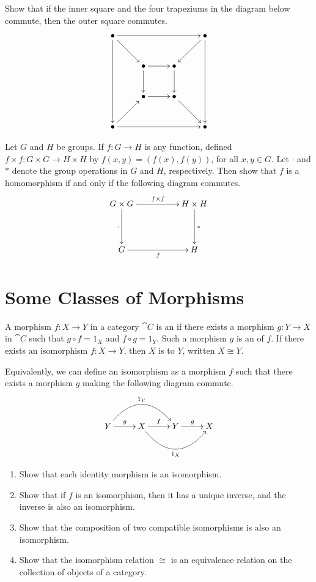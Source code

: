 \begin{Exercise}
Show that if the inner square and the four trapeziums in the diagram below commute, then the outer square commutes.
\begin{equation*}
\xymatrix@=2.5em{
\bullet \ar[ddd] \ar[rd] \ar[rrr] &&& \bullet \ar[ld] \ar[ddd] \\
& \bullet \ar[d] \ar[r] & \bullet \ar[d] & \\
& \bullet \ar[r] & \bullet \ar[rd] & \\
\bullet \ar[ru] \ar[rrr] &&& \bullet
}
\end{equation*}
\end{Exercise}

\begin{Exercise}
Let $G$ and $H$ be groups. If $f \colon G \to H$ is any function, defined $f \times f \colon G \times G \to H \times H$ by $f(x, y) = (f(x), f(y))$, for all $x, y \in G$. Let $\cdot$ and $*$ denote the group operations in $G$ and $H$, respectively. Then show that $f$ is a homomorphism if and only if the following diagram commutes.
\begin{equation*}
\xymatrix@C=5em@R=4em{
G \times G \ar[r]^{f \times f} \ar[d]_\cdot & H \times H \ar[d]^{*} \\
G \ar[r]_f & H
}
\end{equation*}
\end{Exercise}

\section{Some Classes of Morphisms}\label{sec:MorphismClasses}

A morphism $f \colon X \to Y$ in a category $\cat C$ is an  if there exists a morphism $g \colon Y \to X$ in $\cat C$ such that $g \circ f = 1_X$ and $f \circ g = 1_Y$. Such a morphism $g$ is an  of $f$. If there exists an isomorphism $f \colon X \to Y$, then $X$ is  to $Y$, written $X \cong Y$.

Equivalently, we can define an isomorphism as a morphism $f$ such that there exists a morphism $g$ making the following diagram commute.
\begin{equation*}
\xymatrix@C=2.5em{
Y \ar[r]^g \ar@/^2.2pc/[rr]^{1_Y} & X \ar[r]^f \ar@/_2.2pc/[rr]_{1_X} & Y \ar[r]^g & X
}
\end{equation*}

\begin{Exercise}
\begin{enumerate}
\item Show that each identity morphism is an isomorphism.
\item Show that if $f$ is an isomorphism, then it has a unique inverse, and the inverse is also an isomorphism.
\item Show that the composition of two compatible isomorphisms is also an isomorphism.
\item Show that the isomorphism relation $\cong$ is an equivalence relation on the collection of objects of a category.
\end{enumerate}
\end{Exercise}

